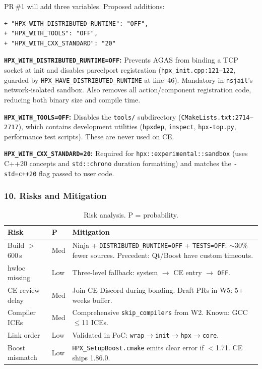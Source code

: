 \documentclass[11pt, a4paper]{article}
\newcommand{\code}[1]{\texttt{#1}}
\newcommand{\cefile}[1]{\texttt{#1}}
\begin{document}
PR\,\#1 will add three variables.  Proposed additions:

\begin{lstlisting}[style=diff, caption={Proposed additions to godbolt-minimal (PR \#1)}]
+ "HPX_WITH_DISTRIBUTED_RUNTIME": "OFF",
+ "HPX_WITH_TOOLS": "OFF",
+ "HPX_WITH_CXX_STANDARD": "20"
\end{lstlisting}

\textbf{\code{HPX\_WITH\_DISTRIBUTED\_RUNTIME=OFF}:}
Prevents AGAS from binding a TCP socket at init and disables parcelport
registration (\cefile{hpx\_init.cpp:121--122}, guarded by
\code{HPX\_HAVE\_DISTRIBUTED\_RUNTIME} at line~46).  Mandatory in
\code{nsjail}'s network-isolated sandbox.  Also removes all action/component
registration code, reducing both binary size and compile time.

\textbf{\code{HPX\_WITH\_TOOLS=OFF}:}
Disables the \cefile{tools/} subdirectory (\cefile{CMakeLists.txt:2714--2717}),
which contains development utilities (\code{hpxdep}, \code{inspect},
\code{hpx-top.py}, performance test scripts).  These are never used on CE.

\textbf{\code{HPX\_WITH\_CXX\_STANDARD=20}:}
Required for \code{hpx::experimental::sandbox} (uses C++20 concepts and
\code{std::chrono} duration formatting) and matches the \code{-std=c++20}
flag passed to user code.

\subsubsection*{10. Risks and Mitigation}

\begin{table}[H]
\centering\small
\begin{tabularx}{\linewidth}{@{}p{2.5cm}lX@{}}
\toprule
\textbf{Risk} & \textbf{P} & \textbf{Mitigation} \\
\midrule
\rowcolor{rowgray}
Build $>$ 600\,s &
  Med &
  Ninja + \code{DISTRIBUTED\_RUNTIME=OFF} + \code{TESTS=OFF}: $\sim$30\%
  fewer sources.  Precedent: Qt/Boost have custom timeouts. \\
hwloc missing &
  Low &
  Three-level fallback: system $\to$ CE entry $\to$ \code{OFF}. \\
\rowcolor{rowgray}
CE review delay &
  Med &
  Join CE Discord during bonding.  Draft PRs in W5: 5+ weeks buffer. \\
Compiler ICEs &
  Med &
  Comprehensive \code{skip\_compilers} from W2.  Known: GCC$\leq$11 ICEs. \\
\rowcolor{rowgray}
Link order &
  Low &
  Validated in PoC: \code{wrap}$\to$\code{init}$\to$\code{hpx}$\to$\code{core}. \\
Boost mismatch &
  Low &
  \cefile{HPX\_SetupBoost.cmake} emits clear error if $<$1.71.
  CE ships 1.86.0. \\
\bottomrule
\end{tabularx}
\caption{Risk analysis. P = probability.}
\end{table}
\end{document}
